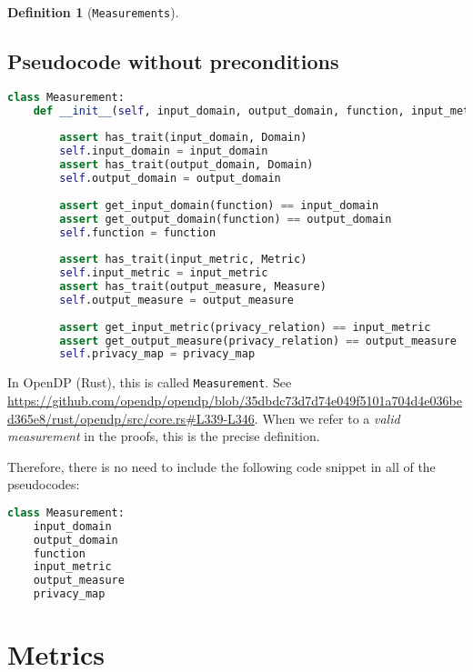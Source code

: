 \documentclass[11pt,a4paper]{article}
\theoremstyle{definition}
\newtheorem{definition}[theorem]{Definition}
\newcommand{\inOpenDPRust}[2]{In OpenDP (Rust), this is called \texttt{#1}. See \url{#2}.}
\begin{document}
\begin{definition}[\texttt{Measurements}]
\subsection{Pseudocode without preconditions}
\label{sec:pseudocode-wout-preconditions}
\begin{lstlisting}[language=Python]
class Measurement:
    def __init__(self, input_domain, output_domain, function, input_metric, output_measure, privacy_map):
        
        assert has_trait(input_domain, Domain)
        self.input_domain = input_domain
        assert has_trait(output_domain, Domain)
        self.output_domain = output_domain
        
        assert get_input_domain(function) == input_domain
        assert get_output_domain(function) == output_domain
        self.function = function
        
        assert has_trait(input_metric, Metric)
        self.input_metric = input_metric
        assert has_trait(output_measure, Measure)
        self.output_measure = output_measure
        
        assert get_input_metric(privacy_relation) == input_metric
        assert get_output_measure(privacy_relation) == output_measure
        self.privacy_map = privacy_map
\end{lstlisting}
    
\inOpenDPRust{Measurement}{https://github.com/opendp/opendp/blob/35dbdc73d7d74e049f5101a704d4e036bed365e8/rust/opendp/src/core.rs\#L339-L346} When we refer to a \textit{valid measurement} in the proofs, this is the precise definition.
\end{definition}
Therefore, there is no need to include the following code snippet in all of the pseudocodes:
\begin{lstlisting}[language=Python]
class Measurement:
    input_domain
    output_domain
    function
    input_metric
    output_measure
    privacy_map 
\end{lstlisting}
\section{Metrics}
\label{sec:metrics}
\end{document}
